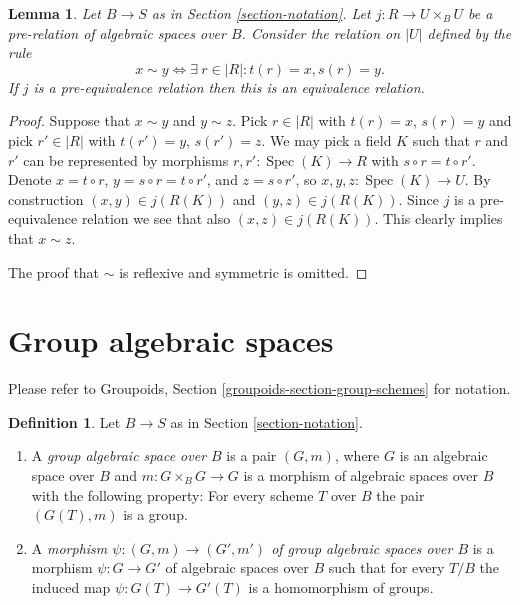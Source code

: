\documentclass{stacks-project}
\theoremstyle{plain}
\newtheorem{lemma}[subsection]{Lemma}
\theoremstyle{definition}
\newtheorem{definition}[subsection]{Definition}
\theoremstyle{remark}
\numberwithin{equation}{subsection}
\def\Spec{\mathop{\mathrm{Spec}}}
\begin{document}
\begin{lemma}
\label{lemma-pre-equivalence-equivalence-relation-points}
Let $B \to S$ as in Section \ref{section-notation}.
Let $j : R \to U \times_B U$ be a pre-relation of algebraic spaces over $B$.
Consider the relation on $|U|$ defined by the rule
$$
x \sim y
\Leftrightarrow
\exists\ r \in |R| :
t(r) = x,
s(r) = y.
$$
If $j$ is a pre-equivalence relation then this is an equivalence relation.
\end{lemma}

\begin{proof}
Suppose that $x \sim y$ and $y \sim z$.
Pick $r \in |R|$ with $t(r) = x$, $s(r) = y$ and
pick $r' \in |R|$ with $t(r') = y$, $s(r') = z$.
We may pick a field $K$ such that $r$ and $r'$ can be
represented by morphisms $r, r' : \Spec(K) \to R$
with $s \circ r = t \circ r'$.
Denote $x = t \circ r$, $y = s \circ r = t \circ r'$,
and $z = s \circ r'$, so $x, y, z : \Spec(K) \to U$.
By construction $(x, y) \in j(R(K))$ and
$(y, z) \in j(R(K))$. Since $j$ is a pre-equivalence relation
we see that also $(x, z) \in j(R(K))$.
This clearly implies that $x \sim z$.

\medskip\noindent
The proof that $\sim$ is reflexive and symmetric is omitted.
\end{proof}















\section{Group algebraic spaces}
\label{section-group-spaces}

\noindent
Please refer to
Groupoids, Section \ref{groupoids-section-group-schemes}
for notation.

\begin{definition}
\label{definition-group-space}
Let $B \to S$ as in Section \ref{section-notation}.
\begin{enumerate}
\item A {\it group algebraic space over $B$} is a pair $(G, m)$, where
$G$ is an algebraic space over $B$ and $m : G \times_B G \to G$ is
a morphism of algebraic spaces over $B$ with the following property:
For every scheme $T$ over $B$ the pair $(G(T), m)$ is a group.
\item A {\it morphism $\psi : (G, m) \to (G', m')$ of
group algebraic spaces over $B$}
is a morphism $\psi : G \to G'$ of algebraic spaces over $B$ such that for
every $T/B$ the induced map $\psi : G(T) \to G'(T)$ is a homomorphism
of groups.
\end{enumerate}
\end{definition}
\end{document}
